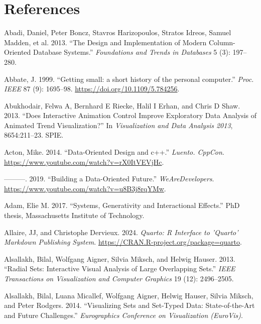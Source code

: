 \documentclass[
]{book}
\newlength{\cslhangindent}
\newenvironment{CSLReferences}[2] %
 {\begin{list}{}{%
  \setlength{\itemindent}{0pt}
  \setlength{\leftmargin}{0pt}
  \setlength{\parsep}{0pt}
  \ifodd #1
   \setlength{\leftmargin}{\cslhangindent}
   \setlength{\itemindent}{-1\cslhangindent}
  \fi
  \setlength{\itemsep}{#2\baselineskip}}}
 {\end{list}}
\theoremstyle{definition}
\theoremstyle{definition}
\theoremstyle{definition}
\theoremstyle{definition}
\theoremstyle{remark}
\begin{document}
\chapter{References}\label{references}

\label{refs}
\begin{CSLReferences}{1}{0}
Abadi, Daniel, Peter Boncz, Stavros Harizopoulos, Stratos Idreos, Samuel Madden, et al. 2013. {``The Design and Implementation of Modern Column-Oriented Database Systems.''} \emph{Foundations and Trends{\textregistered} in Databases} 5 (3): 197--280.

Abbate, J. 1999. {``{Getting small: a short history of the personal computer}.''} \emph{Proc. IEEE} 87 (9): 1695--98. \url{https://doi.org/10.1109/5.784256}.

Abukhodair, Felwa A, Bernhard E Riecke, Halil I Erhan, and Chris D Shaw. 2013. {``Does Interactive Animation Control Improve Exploratory Data Analysis of Animated Trend Visualization?''} In \emph{Visualization and Data Analysis 2013}, 8654:211--23. SPIE.

Acton, Mike. 2014. {``Data-Oriented Design and c++.''} \emph{Luento. CppCon}. \url{https://www.youtube.com/watch?v=rX0ItVEVjHc}.

---------. 2019. {``Building a Data-Oriented Future.''} \emph{WeAreDevelopers}. \url{https://www.youtube.com/watch?v=u8B3j8rqYMw}.

Adam, Elie M. 2017. {``Systems, Generativity and Interactional Effects.''} PhD thesis, Massachusetts Institute of Technology.

Allaire, JJ, and Christophe Dervieux. 2024. \emph{Quarto: R Interface to 'Quarto' Markdown Publishing System}. \url{https://CRAN.R-project.org/package=quarto}.

Alsallakh, Bilal, Wolfgang Aigner, Silvia Miksch, and Helwig Hauser. 2013. {``Radial Sets: Interactive Visual Analysis of Large Overlapping Sets.''} \emph{IEEE Transactions on Visualization and Computer Graphics} 19 (12): 2496--2505.

Alsallakh, Bilal, Luana Micallef, Wolfgang Aigner, Helwig Hauser, Silvia Miksch, and Peter Rodgers. 2014. {``Visualizing Sets and Set-Typed Data: State-of-the-Art and Future Challenges.''} \emph{Eurographics Conference on Visualization (EuroVis)}.


\end{CSLReferences}
\end{document}
